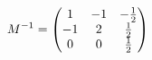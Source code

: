 \documentclass[preview]{standalone}
\begin{document}
\begin{align*}
\special{dvisvgm:raw <g id='unique000'>}M^{-1}=\begin{pmatrix}1&-1&-\frac12\\-1&2&\frac12\\0&0&\frac12\end{pmatrix}\special{dvisvgm:raw </g>}
\end{align*}
\end{document}
